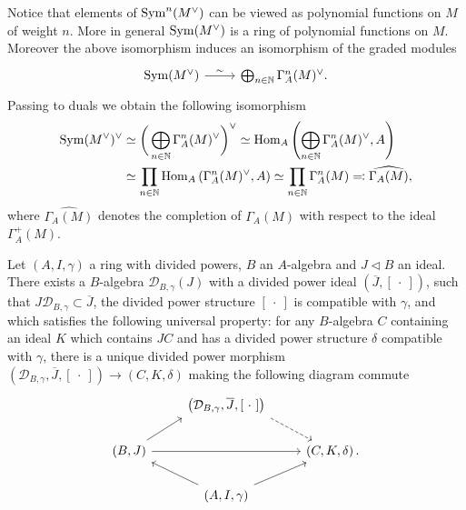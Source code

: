 \begin{rem}
	Notice that elements of \(\operatorname{Sym}^n(M^\vee)\) can be viewed as
	polynomial functions on \(M\) of weight \(n\).
	More in general \(\operatorname{Sym}(M^\vee)\) is a ring of
	polynomial functions on \(M\).
	Moreover the above isomorphism induces an isomorphism
	of the graded modules
	\begin{equation*}
	\begin{tikzcd}
		\sym(M^\vee)
		\arrow[r, "\sim", rightarrow] &
		\bigoplus_{ n \in \mathbb{N} } \Gamma^n_A(M)^\vee
	.\end{tikzcd}
	\end{equation*}
	Passing to duals we obtain the following isomorphism
	\begin{align*}
		\operatorname{Sym}(M^\vee)^\vee &\simeq
		\bigg( \bigoplus_{ n \in \mathbb{N} } \Gamma^n_A(M)^\vee \bigg)^\vee \simeq
		\operatorname{Hom}_A \left(\bigoplus_{ n \in \mathbb{N} } \Gamma_A^n(M)^\vee, A\right) \\
		&\simeq
		\prod_{ n \in \mathbb{N} } \operatorname{Hom}_A \left(\Gamma_A^n(M)^\vee, A\right) \simeq
		\prod_{ n \in \mathbb{N} } \Gamma_A^n(M) \eqqcolon
		\widehat{\Gamma_A(M)}
	,\end{align*}
	where \(\widehat{\Gamma_A(M)}\) denotes the completion of
	\(\Gamma_A(M)\) with respect to the ideal \(\Gamma_A^+(M)\).
\end{rem}


\begin{thm}\label{thm:PDEnvelope}
	Let $\left(A, I, \gamma\right)$ a ring with divided powers, $B$ an $A$-algebra
	and $J \triangleleft B$ an ideal.
	There exists a $B$-algebra $\mathcal{D}_{B,\gamma}(J)$
	with a divided power ideal $\left(\overline{J}, [\ \cdot \ ]\right)$,
	such that $J \mathcal{D}_{B, \gamma} \subset \overline{J}$,
	the divided power structure $[\ \cdot \ ]$ 
	is compatible with $\gamma$, and which satisfies the
	following universal property:
	for any $B$-algebra $C$ containing an ideal
	$K$ which contains $JC$ and has a divided power structure
	$\delta$ compatible  with $\gamma$, there is a unique 
	divided power morphism 
	$\left(\mathcal{D}_{B,\gamma}, \overline{J}, [\ \cdot \ ]\right) \to 
	\left(C, K, \delta\right)$ making the following
	diagram commute
	\begin{equation*}
	\begin{tikzcd}
		&
		\left(\mathcal{D}_{B, \gamma}, \overline{J}, [\ \cdot \ ]\right)
		\arrow[rd, "", dashrightarrow,
		start anchor=south east] & \\
		\left(B, J\right) \arrow[ru, "", rightarrow,
		end anchor=south west] 
		\arrow[rr, "", rightarrow] & &
		\left(C, K, \delta\right). \\
		&
		\left(A, I, \gamma\right)
		\arrow[lu, "", rightarrow,
		start anchor=north west] 
		\arrow[ru, "", rightarrow,
		start anchor=north east] & 
	\end{tikzcd}
	\end{equation*}
\end{thm}


